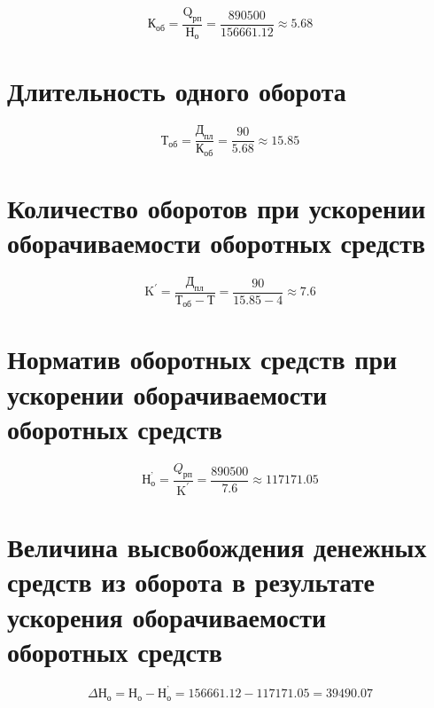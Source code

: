 \[
\text{К}_\text{об}=\frac{\text{Q}_\text{рп}}{\text{Н}_\text{о}}=\frac{890500}{156661.12} \approx 5.68
\]

\section{Длительность одного оборота}

\[
\text{Т}_\text{об}=\frac{\text{Д}_\text{пл}}{\text{К}_\text{об}}=\frac{90}{5.68} \approx 15.85
\]

\section{Количество оборотов при ускорении оборачиваемости оборотных средств}

\[
\text{K}^{'}=\frac{\text{Д}_\text{пл}}{\text{Т}_\text{об}-\text{Т}}=\frac{90}{15.85-4} \approx 7.6
\]


\section{Норматив оборотных средств при ускорении оборачиваемости оборотных средств}

\[
\text{Н}_\text{о}^\text{'}=\frac{Q_\text{рп}}{\text{K}^{'}}=\frac{890500}{7.6} \approx 117171.05
\]

\section{Величина высвобождения денежных средств из оборота в результате ускорения оборачиваемости оборотных средств}

\[
\Delta \text{Н}_\text{о}=\text{Н}_\text{о}-\text{Н}_\text{о}^\text{'}=156661.12-117171.05=39490.07
\]
